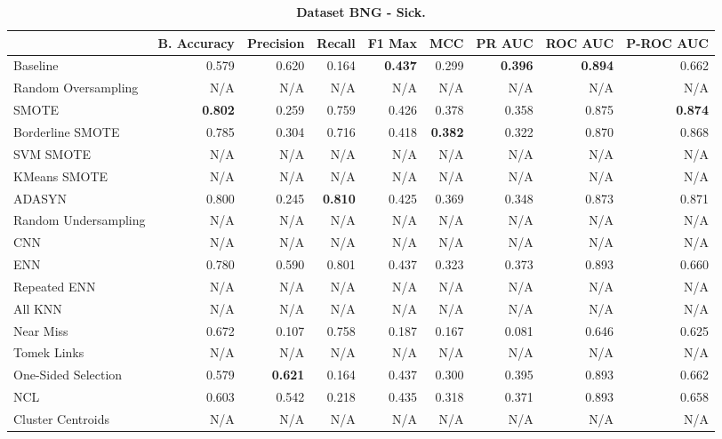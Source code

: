 \begin{table}[H]
    \centering
    \setlength\tabcolsep{2pt}
    \begin{tabularx}{\textwidth}{lRRRRRRRR}
        & B. Accuracy & Precision & Recall & F1 Max & MCC & PR AUC & ROC AUC & P-ROC AUC \\
        \midrule
        Baseline & 0.579 & 0.620 & 0.164 & \textbf{0.437} & 0.299 & \textbf{0.396} & \textbf{0.894} & 0.662 \\
        Random Oversampling & N/A & N/A & N/A & N/A & N/A & N/A & N/A & N/A \\
        SMOTE & \textbf{0.802} & 0.259 & 0.759 & 0.426 & 0.378 & 0.358 & 0.875 & \textbf{0.874} \\
        Borderline SMOTE & 0.785 & 0.304 & 0.716 & 0.418 & \textbf{0.382} & 0.322 & 0.870 & 0.868 \\
        SVM SMOTE & N/A & N/A & N/A & N/A & N/A & N/A & N/A & N/A \\
        KMeans SMOTE & N/A & N/A & N/A & N/A & N/A & N/A & N/A & N/A \\
        ADASYN & 0.800 & 0.245 & \textbf{0.810} & 0.425 & 0.369 & 0.348 & 0.873 & 0.871 \\
        Random Undersampling & N/A & N/A & N/A & N/A & N/A & N/A & N/A & N/A \\
        CNN & N/A & N/A & N/A & N/A & N/A & N/A & N/A & N/A \\
        ENN & 0.780 & 0.590 & 0.801 & 0.437 & 0.323 & 0.373 & 0.893 & 0.660 \\
        Repeated ENN & N/A & N/A & N/A & N/A & N/A & N/A & N/A & N/A \\
        All KNN & N/A & N/A & N/A & N/A & N/A & N/A & N/A & N/A \\
        Near Miss & 0.672 & 0.107 & 0.758 & 0.187 & 0.167 & 0.081 & 0.646 & 0.625 \\
        Tomek Links & N/A & N/A & N/A & N/A & N/A & N/A & N/A & N/A \\
        One-Sided Selection & 0.579 & \textbf{0.621} & 0.164 & 0.437 & 0.300 & 0.395 & 0.893 & 0.662 \\
        NCL & 0.603 & 0.542 & 0.218 & 0.435 & 0.318 & 0.371 & 0.893 & 0.658 \\
        Cluster Centroids & N/A & N/A & N/A & N/A & N/A & N/A & N/A & N/A \\
    \end{tabularx}
    \vspace{1mm}
    \caption{\textbf{Dataset BNG - Sick.}}
\end{table}

